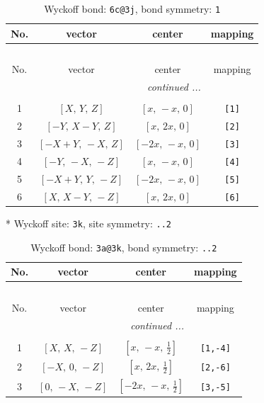 \documentclass[fleqn,8pt]{jsarticle}
\begin{document}
\renewcommand{\arraystretch}{1.2}
\begin{longtable}{cccc}
\caption{Wyckoff bond: {\tt 6c@3j}, bond symmetry: {\tt 1}}
 \\
 \hline \hline
No. & vector & center & mapping \\ \hline \endfirsthead

\multicolumn{3}{l}{\tablename\ \thetable{}} \\
 \hline \hline
No. & vector & center & mapping \\ \hline \endhead

 \hline \hline
\multicolumn{3}{r}{\footnotesize\it continued ...} \\ \endfoot

 \hline \hline
\multicolumn{3}{r}{} \\ \endlastfoot

1 & $\left[ X,\, Y,\, Z \right]$ & $\left[ x,\, - x,\, 0 \right]$ & {\tt [1]} \\ \hline
2 & $\left[ - Y,\, X - Y,\, Z \right]$ & $\left[ x,\, 2 x,\, 0 \right]$ & {\tt [2]} \\ \hline
3 & $\left[ - X + Y,\, - X,\, Z \right]$ & $\left[ - 2 x,\, - x,\, 0 \right]$ & {\tt [3]} \\ \hline
4 & $\left[ - Y,\, - X,\, - Z \right]$ & $\left[ x,\, - x,\, 0 \right]$ & {\tt [4]} \\ \hline
5 & $\left[ - X + Y,\, Y,\, - Z \right]$ & $\left[ - 2 x,\, - x,\, 0 \right]$ & {\tt [5]} \\ \hline
6 & $\left[ X,\, X - Y,\, - Z \right]$ & $\left[ x,\, 2 x,\, 0 \right]$ & {\tt [6]} \\
\end{longtable}
* Wyckoff site: {\tt 3k}, site symmetry: {\tt ..2}
\renewcommand{\arraystretch}{1.2}
\begin{longtable}{cccc}
\caption{Wyckoff bond: {\tt 3a@3k}, bond symmetry: {\tt ..2}}
 \\
 \hline \hline
No. & vector & center & mapping \\ \hline \endfirsthead

\multicolumn{3}{l}{\tablename\ \thetable{}} \\
 \hline \hline
No. & vector & center & mapping \\ \hline \endhead

 \hline \hline
\multicolumn{3}{r}{\footnotesize\it continued ...} \\ \endfoot

 \hline \hline
\multicolumn{3}{r}{} \\ \endlastfoot

1 & $\left[ X,\, X,\, - Z \right]$ & $\left[ x,\, - x,\, \frac{1}{2} \right]$ & {\tt [1,-4]} \\ \hline
2 & $\left[ - X,\, 0,\, - Z \right]$ & $\left[ x,\, 2 x,\, \frac{1}{2} \right]$ & {\tt [2,-6]} \\ \hline
3 & $\left[ 0,\, - X,\, - Z \right]$ & $\left[ - 2 x,\, - x,\, \frac{1}{2} \right]$ & {\tt [3,-5]} \\
\end{longtable}
\end{document}
